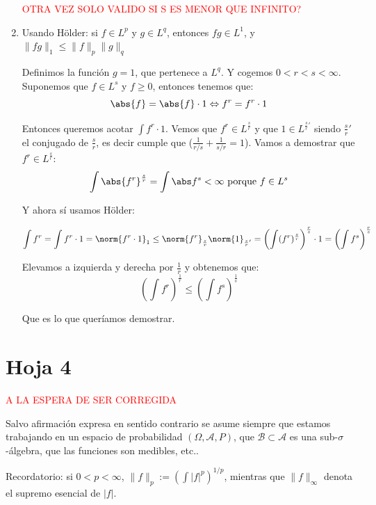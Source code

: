 \begin{problem}[8]
\begin{enumerate}
\textcolor{red}{OTRA VEZ SOLO VALIDO SI S ES MENOR QUE INFINITO?}

\item Usando Hölder:
si $f\in L^p$ y $g\in L^q$, entonces $fg\in L^1$, y $\|fg\|_1 \le \|f\|_p\|g\|_q$

Definimos la función $g=1$, que pertenece a $L^q$. Y cogemos $0<r<s<\infty$. Suponemos que $f \in L^s$ y $f\geq 0$, entonces tenemos que:
\[
\abs{f}=\abs{f}\cdot 1  \Leftrightarrow f^r = f^r \cdot 1
\]

Entonces queremos acotar $\int f^r \cdot 1$. Vemos que $f^r \in L^{\frac{s}{r}}$ y que $1 \in L^{\frac{s}{r}'}$  siendo $\frac{s}{r}'$ el conjugado de $\frac{s}{r}$, es decir cumple que ($\frac{1}{r/s}+\frac{1}{s/r} = 1$). Vamos a demostrar que  $f^r \in L^{\frac{s}{r}}$:
\[
 \int \abs{f^r}^{\frac{s}{r}} =  \int \abs f^s < \infty \text{ porque } f\in L^s
\]

Y ahora sí usamos Hölder:

\[
\int f^r = \int f^r \cdot 1 = \norm{f^r \cdot 1}_1 \leq \norm{f^r}_{\frac{s}{r}}\norm{1}_{\frac{s}{r}'}=\left( \int(f^r)^{\frac{s}{r}} \right)^{\frac{r}{s}} \cdot 1 = \left( \int f^s \right)^{\frac{r}{s}}
\]

Elevamos a izquierda y derecha por $\frac{1}{r}$ y obtenemos que:
\[
\left( \int f^r \right)^{\frac{1}{r}} \leq \left( \int f^s \right)^{\frac{1}{s}}
\]

Que es lo que queríamos demostrar.
\end{enumerate}



\end{problem}




\newpage
\section{Hoja 4}

\textcolor{red}{A LA ESPERA DE SER CORREGIDA}

Salvo afirmaci\'on expresa en sentido
contrario se asume siempre que estamos trabajando en un espacio de probabilidad $(\Omega, \mathcal{A}, P)$,
que  $\mathcal{B}\subset \mathcal{A}$ es una sub-$\sigma$-\'algebra, que las funciones son medibles, etc..

Recordatorio: si $0 < p < \infty$, $\|f\|_p := \left(\int|f|^p\right)^{1/p}$, mientras que
$\|f\|_\infty$ denota el supremo esencial de $|f|$. 


